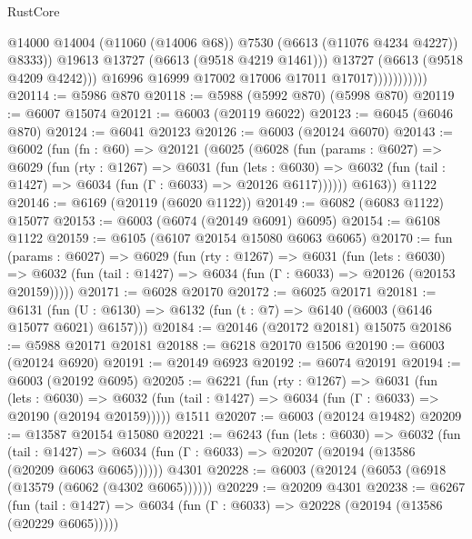 \begin{lexlean}{RustCore}
\begin{coremodule}
                                  @14000
                                  @14004
                                  (@11060 (@14006 @68))
                                  @7530
                                  (@6613 (@11076 @4234 @4227))
                                  @8333))
                              @19613
                              @13727
                              (@6613 (@9518 @4219 @1461)))
                            @13727
                            (@6613 (@9518 @4209 @4242)))
                          @16996
                          @16999
                          @17002
                          @17006
                          @17011
                          @17017)))))))))))
@20114 := @5986 @870
@20118 := @5988 (@5992 @870) (@5998 @870)
@20119 := @6007 @15074
@20121 := @6003 (@20119 @6022)
@20123 := @6045 (@6046 @870)
@20124 := @6041 @20123
@20126 := @6003 (@20124 @6070)
@20143 := @6002
    (fun (fn : @60) =>
    @20121
      (@6025
        (@6028
          (fun (params : @6027) =>
          @6029
            (fun (rty : @1267) =>
            @6031
              (fun (lets : @6030) =>
              @6032 (fun (tail : @1427) => @6034 (fun (Γ : @6033) => @20126 @6117))))))
        @6163))
    @1122
@20146 := @6169 (@20119 (@6020 @1122))
@20149 := @6082 (@6083 @1122) @15077
@20153 := @6003 (@6074 (@20149 @6091) @6095)
@20154 := @6108 @1122
@20159 := @6105 (@6107 @20154 @15080 @6063 @6065)
@20170 := fun (params : @6027) =>
  @6029
    (fun (rty : @1267) =>
    @6031
      (fun (lets : @6030) =>
      @6032 (fun (tail : @1427) => @6034 (fun (Γ : @6033) => @20126 (@20153 @20159)))))
@20171 := @6028 @20170
@20172 := @6025 @20171
@20181 := @6131
    (fun (U : @6130) => @6132 (fun (t : @7) => @6140 (@6003 (@6146 @15077 @6021) @6157)))
@20184 := @20146 (@20172 @20181) @15075
@20186 := @5988 @20171 @20181
@20188 := @6218 @20170 @1506
@20190 := @6003 (@20124 @6920)
@20191 := @20149 @6923
@20192 := @6074 @20191
@20194 := @6003 (@20192 @6095)
@20205 := @6221
    (fun (rty : @1267) =>
    @6031
      (fun (lets : @6030) =>
      @6032 (fun (tail : @1427) => @6034 (fun (Γ : @6033) => @20190 (@20194 @20159)))))
    @1511
@20207 := @6003 (@20124 @19482)
@20209 := @13587 @20154 @15080
@20221 := @6243
    (fun (lets : @6030) =>
    @6032
      (fun (tail : @1427) =>
      @6034 (fun (Γ : @6033) => @20207 (@20194 (@13586 (@20209 @6063 @6065))))))
    @4301
@20228 := @6003 (@20124 (@6053 (@6918 (@13579 (@6062 (@4302 @6065))))))
@20229 := @20209 @4301
@20238 := @6267
    (fun (tail : @1427) => @6034 (fun (Γ : @6033) => @20228 (@20194 (@13586 (@20229 @6065)))))

\end{coremodule}
\end{lexlean}
